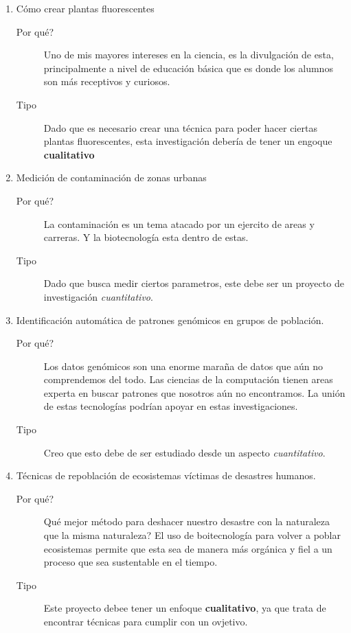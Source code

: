 \documentclass[12pt]{article}
\begin{document}
\begin{enumerate}
	\item C\'omo crear plantas fluorescentes
		\begin{description}
			\item [Por qu\'e?] Uno de mis mayores intereses en la ciencia, es la divulgaci\'on de esta, principalmente a nivel de educaci\'on b\'asica que es donde los alumnos son m\'as receptivos y curiosos.
			\item [Tipo] Dado que es necesario crear una t\'ecnica para poder hacer ciertas plantas fluorescentes, esta investigaci\'on deber\'ia de tener un engoque \textbf{cualitativo}
		\end{description}
	
	\item Medici\'on de contaminaci\'on de zonas urbanas
		\begin{description}
			\item [Por qu\'e?] La contaminaci\'on es un tema atacado por un ejercito de areas y carreras. Y la biotecnolog\'ia esta dentro de estas.
			\item [Tipo] Dado que busca medir ciertos parametros, este debe ser un proyecto de investigaci\'on \textit{cuantitativo}.
		\end{description}
		
	\item Identificaci\'on autom\'atica de patrones gen\'omicos en grupos de poblaci\'on.
		\begin{description}
			\item [Por qu\'e?] Los datos gen\'omicos son una enorme mara\~na de datos que a\'un no comprendemos del todo. Las ciencias de la computaci\'on tienen areas experta en buscar patrones que nosotros a\'un no encontramos. La uni\'on de estas tecnolog\'ias podr\'ian apoyar en estas investigaciones.
			\item [Tipo] Creo que esto debe de ser estudiado desde un aspecto \textit{cuantitativo}.
		\end{description}
		
	\item T\'ecnicas de repoblación de ecosistemas víctimas de desastres humanos.
		\begin{description}
			\item [Por qu\'e?] Qu\'e mejor m\'etodo para deshacer nuestro desastre con la naturaleza que la misma naturaleza? El uso de boitecnolog\'ia para volver a poblar ecosistemas permite que esta sea de manera m\'as org\'anica y fiel a un proceso que sea sustentable en el tiempo.
			\item [Tipo] Este proyecto debee tener un enfoque \textbf{cualitativo}, ya que trata de encontrar t\'ecnicas para cumplir con un ovjetivo.
		\end{description}
		

\end{enumerate}
\end{document}
